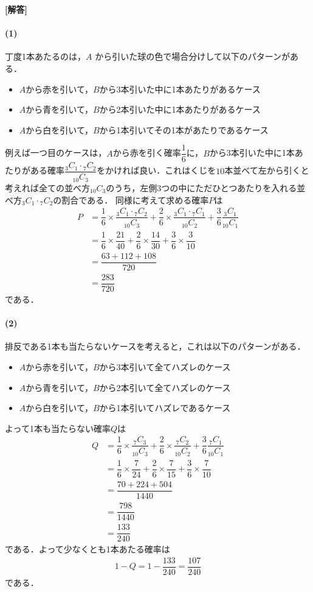 \documentclass[../../main.tex]{subfiles}
\begin{document}
\begin{oframed}
  
\end{oframed}

{\bf [解答]}
\paragraph{(1)}
丁度1本あたるのは，$A$ から引いた球の色で場合分けして以下のパターンがある．
\begin{itemize}
  \item $A$から赤を引いて，$B$から3本引いた中に1本あたりがあるケース
  \item $A$から青を引いて，$B$から2本引いた中に1本あたりがあるケース
  \item $A$から白を引いて，$B$から1本引いてその1本があたりであるケース
\end{itemize}
例えば一つ目のケースは，$A$から赤を引く確率$\dfrac{1}{6}$に，$B$から3本引いた中に1本あたりがある確率$\dfrac{{}_3C_1\cdot{}_7C_2}{{}_{10}C_3}$をかければ良い．これはくじを$10$本並べて左から引くと考えれば全ての並べ方${}_{10}C_3$のうち，左側$3$つの中にただひとつあたりを入れる並べ方${}_3C_1\cdot{}_7C_2$の割合である．
同様に考えて求める確率$P$は
\begin{align}
  P
  &= \dfrac{1}{6}\times\dfrac{{}_3C_1\cdot{}_7C_2}{{}_{10}C_3}+\dfrac{2}{6}\times\dfrac{{}_3C_1\cdot{}_7C_1}{{}_{10}C_2}+\dfrac{3}{6}\dfrac{{}_3C_1}{{}_{10}C_1} \\
  &= \dfrac{1}{6}\times\dfrac{21}{40}+\dfrac{2}{6}\times\dfrac{14}{30}+\dfrac{3}{6}\times\dfrac{3}{10} \\
  &= \dfrac{63+112+108}{720} \\
  &= \dfrac{283}{720}
\end{align}
である．

\paragraph{(2)}
排反である1本も当たらないケースを考えると，これは以下のパターンがある．
\begin{itemize}
  \item $A$から赤を引いて，$B$から3本引いて全てハズレのケース
  \item $A$から青を引いて，$B$から2本引いて全てハズレのケース
  \item $A$から白を引いて，$B$から1本引いてハズレであるケース
\end{itemize}
よって1本も当たらない確率$Q$は
\begin{align}
  Q
  &=\dfrac{1}{6}\times\dfrac{{}_7C_3}{{}_{10}C_3}+\dfrac{2}{6}\times\dfrac{{}_7C_2}{{}_{10}C_2}+\dfrac{3}{6}\dfrac{{}_7C_1}{{}_{10}C_1} \\
  &=\dfrac{1}{6}\times\dfrac{7}{24}+\dfrac{2}{6}\times\dfrac{7}{15}+\dfrac{3}{6}\times\dfrac{7}{10} \\
  &=\dfrac{70+224+504}{1440} \\
  &=\dfrac{798}{1440} \\
  &=\dfrac{133}{240}
\end{align}
である．よって少なくとも1本あたる確率は
\begin{align}
  1-Q = 1-\dfrac{133}{240}=\dfrac{107}{240}
\end{align}
である．

\newpage
\end{document}
